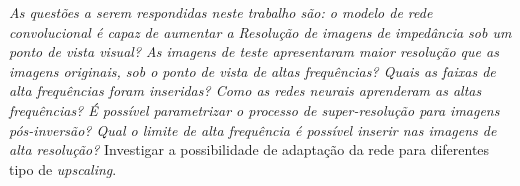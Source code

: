 % 
% 
% 
% 
% 
% 
\textit{ As questões a serem respondidas neste trabalho são: o modelo de rede convolucional é capaz de aumentar a Resolução de imagens de impedância
sob um ponto de vista visual? As imagens de teste apresentaram maior resolução que as imagens originais, sob o ponto 
de vista de altas frequências? Quais as faixas de alta frequências foram inseridas? Como as redes neurais aprenderam
as altas frequências? É possível parametrizar o processo de super-resolução para imagens pós-inversão?
Qual o limite de alta frequência é possível inserir nas imagens de alta resolução?}
Investigar a possibilidade de adaptação da rede para diferentes tipo de \textit{upscaling}.

